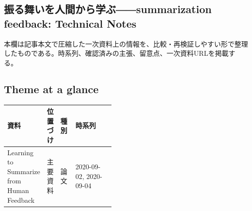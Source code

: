 \subsection*{振る舞いを人間から学ぶ――summarization feedback: Technical Notes}
本欄は記事本文で圧縮した一次資料上の情報を、比較・再検証しやすい形で整理したものである。時系列、確認済みの主張、留意点、一次資料URLを掲載する。
\smallskip
{}\par
\medskip
\subsection*{Theme at a glance}
\begin{center}
\footnotesize
\begin{tabularx}{\linewidth}{@{}p{0.20\linewidth}p{0.10\linewidth}p{0.14\linewidth}X@{}}
\toprule
資料 & 位置づけ & 種別 & 時系列 \\
\midrule
Learning to Summarize from Human Feedback & 主要資料 & 論文 & 2020-09-02, 2020-09-04 \\
\bottomrule
\end{tabularx}
\end{center}
\normalsize

